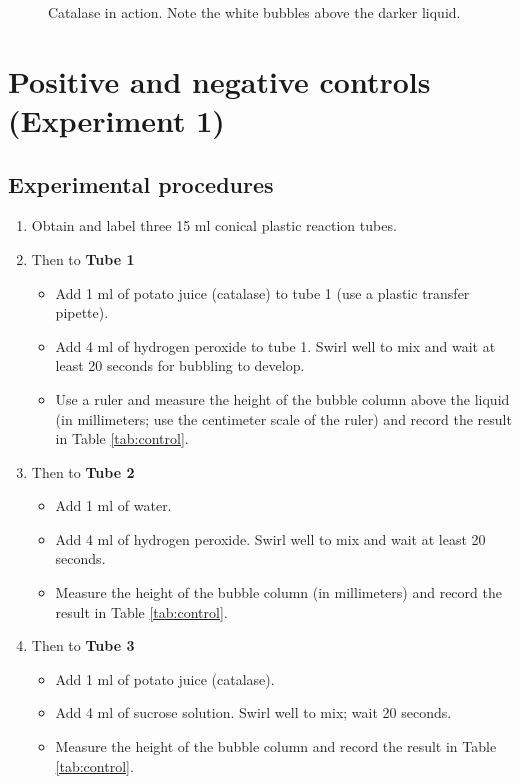\documentclass[]{book}
\providecommand{\tightlist}{%
  \setlength{\itemsep}{0pt}\setlength{\parskip}{0pt}}
\theoremstyle{definition}
\theoremstyle{definition}
\theoremstyle{definition}
\theoremstyle{remark}
\begin{document}
\begin{figure}
{}

\caption{Catalase in action. Note the white bubbles above the darker liquid.}\label{fig:catalase}
\end{figure}

\section{Positive and negative controls (Experiment
1)}\label{positive-and-negative-controls-experiment-1}

\subsection{Experimental procedures}\label{experimental-procedures-20}

\begin{enumerate}
\def\labelenumi{\arabic{enumi}.}
\tightlist
\item
  Obtain and label three 15 ml conical plastic reaction tubes.
\item
  Then to \textbf{Tube 1}

  \begin{itemize}
  \tightlist
  \item
    Add 1 ml of potato juice (catalase) to tube 1 (use a plastic
    transfer pipette).
  \item
    Add 4 ml of hydrogen peroxide to tube 1. Swirl well to mix and wait
    at least 20 seconds for bubbling to develop.
  \item
    Use a ruler and measure the height of the bubble column above the
    liquid (in millimeters; use the centimeter scale of the ruler) and
    record the result in Table \ref{tab:control}.
  \end{itemize}
\item
  Then to \textbf{Tube 2}

  \begin{itemize}
  \tightlist
  \item
    Add 1 ml of water.
  \item
    Add 4 ml of hydrogen peroxide. Swirl well to mix and wait at least
    20 seconds.
  \item
    Measure the height of the bubble column (in millimeters) and record
    the result in Table \ref{tab:control}.
  \end{itemize}
\item
  Then to \textbf{Tube 3}

  \begin{itemize}
  \tightlist
  \item
    Add 1 ml of potato juice (catalase).
  \item
    Add 4 ml of sucrose solution. Swirl well to mix; wait 20 seconds.
  \item
    Measure the height of the bubble column and record the result in
    Table \ref{tab:control}.
  \end{itemize}
\end{enumerate}
\end{document}
